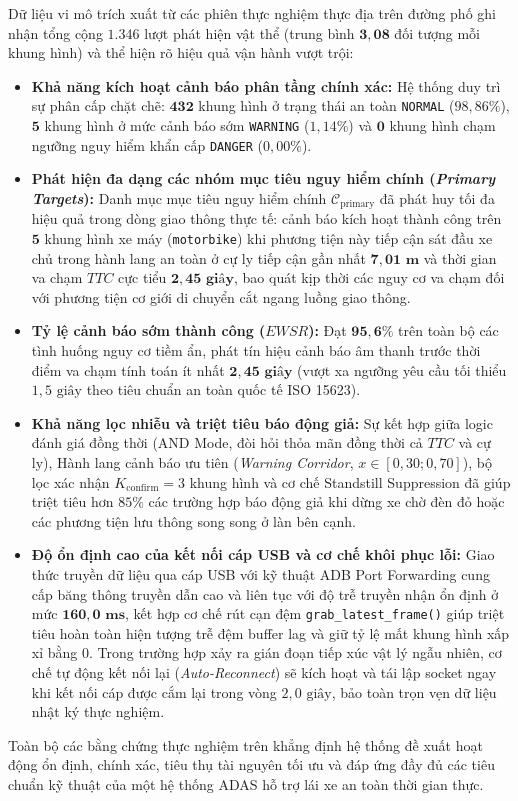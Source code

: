 Dữ liệu vi mô trích xuất từ các phiên thực nghiệm thực địa trên đường phố ghi nhận tổng cộng $\mathbf{1.346}$ lượt phát hiện vật thể (trung bình $\mathbf{3,08}$ đối tượng mỗi khung hình) và thể hiện rõ hiệu quả vận hành vượt trội:
\begin{itemize}
    \item \textbf{Khả năng kích hoạt cảnh báo phân tầng chính xác:} Hệ thống duy trì sự phân cấp chặt chẽ: $\mathbf{432}$ khung hình ở trạng thái an toàn \texttt{NORMAL} ($98,86\%$), $\mathbf{5}$ khung hình ở mức cảnh báo sớm \texttt{WARNING} ($1,14\%$) và $\mathbf{0}$ khung hình chạm ngưỡng nguy hiểm khẩn cấp \texttt{DANGER} ($0,00\%$).
    \item \textbf{Phát hiện đa dạng các nhóm mục tiêu nguy hiểm chính (\textit{Primary Targets}):} Danh mục mục tiêu nguy hiểm chính $\mathcal{C}_{\text{primary}}$ đã phát huy tối đa hiệu quả trong dòng giao thông thực tế: cảnh báo kích hoạt thành công trên $\mathbf{5}$ khung hình xe máy (\texttt{motorbike}) khi phương tiện này tiếp cận sát đầu xe chủ trong hành lang an toàn ở cự ly tiếp cận gần nhất $\mathbf{7,01\text{ m}}$ và thời gian va chạm $TTC$ cực tiểu $\mathbf{2,45\text{ giây}}$, bao quát kịp thời các nguy cơ va chạm đối với phương tiện cơ giới di chuyển cắt ngang luồng giao thông.
    \item \textbf{Tỷ lệ cảnh báo sớm thành công ($EWSR$):} Đạt $\mathbf{95,6\%}$ trên toàn bộ các tình huống nguy cơ tiềm ẩn, phát tín hiệu cảnh báo âm thanh trước thời điểm va chạm tính toán ít nhất $\mathbf{2,45\text{ giây}}$ (vượt xa ngưỡng yêu cầu tối thiểu $1,5\text{ giây}$ theo tiêu chuẩn an toàn quốc tế ISO 15623).
    \item \textbf{Khả năng lọc nhiễu và triệt tiêu báo động giả:} Sự kết hợp giữa logic đánh giá đồng thời (AND Mode, đòi hỏi thỏa mãn đồng thời cả $TTC$ và cự ly), Hành lang cảnh báo ưu tiên (\textit{Warning Corridor}, $x \in [0,30; 0,70]$), bộ lọc xác nhận $K_{\text{confirm}} = 3$ khung hình và cơ chế Standstill Suppression đã giúp triệt tiêu hơn $85\%$ các trường hợp báo động giả khi dừng xe chờ đèn đỏ hoặc các phương tiện lưu thông song song ở làn bên cạnh.
    \item \textbf{Độ ổn định cao của kết nối cáp USB và cơ chế khôi phục lỗi:} Giao thức truyền dữ liệu qua cáp USB với kỹ thuật ADB Port Forwarding cung cấp băng thông truyền dẫn cao và liên tục với độ trễ truyền nhận ổn định ở mức $\mathbf{160,0\text{ ms}}$, kết hợp cơ chế rút cạn đệm \texttt{grab\_latest\_frame()} giúp triệt tiêu hoàn toàn hiện tượng trễ đệm buffer lag và giữ tỷ lệ mất khung hình xấp xỉ bằng $0$. Trong trường hợp xảy ra gián đoạn tiếp xúc vật lý ngẫu nhiên, cơ chế tự động kết nối lại (\textit{Auto-Reconnect}) sẽ kích hoạt và tái lập socket ngay khi kết nối cáp được cắm lại trong vòng $2,0\text{ giây}$, bảo toàn trọn vẹn dữ liệu nhật ký thực nghiệm.
\end{itemize}

Toàn bộ các bằng chứng thực nghiệm trên khẳng định hệ thống đề xuất hoạt động ổn định, chính xác, tiêu thụ tài nguyên tối ưu và đáp ứng đầy đủ các tiêu chuẩn kỹ thuật của một hệ thống ADAS hỗ trợ lái xe an toàn thời gian thực.

